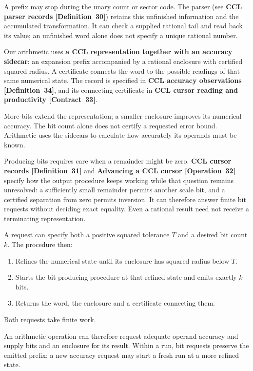 \documentclass[11pt]{article}
\newcommand{\entryname}[3]{\textbf{#3 \mbox{[#1~#2]}}}
\begin{document}
A prefix may stop during the unary count or sector code. The parser
(see \entryname{Definition}{30}{CCL parser records}) retains
this unfinished information and the accumulated transformation. It can
check a supplied rational tail and read back its value; an unfinished
word alone does not specify a unique rational number.

Our arithmetic uses \textbf{a CCL representation together with an accuracy
sidecar}: an expansion prefix accompanied by a rational enclosure with
certified squared radius. A certificate connects the word to the possible
readings of that same numerical state.
The record is specified in \entryname{Definition}{34}{CCL accuracy observations}, and its
connecting certificate in \entryname{Contract}{33}{CCL cursor reading and productivity}.

More bits extend the representation; a smaller enclosure improves its
numerical accuracy. The bit count alone does not certify a requested error
bound. Arithmetic uses the sidecars to calculate how accurately its operands
must be known.

Producing bits requires care when a remainder might be zero.
\entryname{Definition}{31}{CCL cursor records} and \entryname{Operation}{32}{Advancing a CCL cursor}
specify how the output procedure keeps working while that question remains
unresolved: a
sufficiently small remainder permits another scale bit, and a certified
separation from zero permits inversion. It can therefore answer finite
bit requests without deciding exact equality. Even a rational result need
not receive a terminating representation.

\begingroup\samepage
A request can specify both a positive squared tolerance $T$ and a desired
bit count $k$. The procedure then:
\begin{enumerate}
\item Refines the numerical state until its enclosure has squared radius
below $T$.
\item Starts the bit-producing procedure at that refined state and emits
exactly $k$ bits.
\item Returns the word, the enclosure and a certificate connecting them.
\end{enumerate}
Both requests take finite work.
\par\endgroup
An arithmetic operation can therefore
request adequate operand accuracy and supply bits and an enclosure for its
result. Within a run, bit requests preserve the emitted prefix; a new
accuracy request may start a fresh run at a more refined state.
\end{document}
